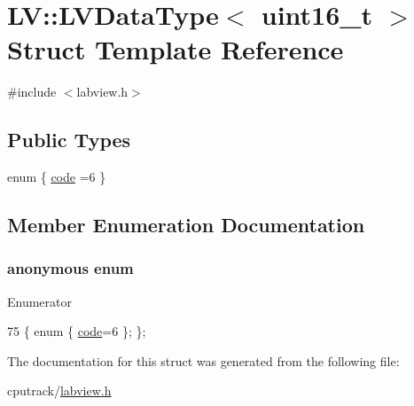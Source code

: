 \hypertarget{struct_l_v_1_1_l_v_data_type_3_01uint16__t_01_4}{}\section{LV\+:\+:L\+V\+Data\+Type$<$ uint16\+\_\+t $>$ Struct Template Reference}
\label{struct_l_v_1_1_l_v_data_type_3_01uint16__t_01_4}


{\ttfamily \#include $<$labview.\+h$>$}

\subsection*{Public Types}
\begin{DoxyCompactItemize}
\item 
enum \{ \hyperlink{struct_l_v_1_1_l_v_data_type_3_01uint16__t_01_4_a0e8b2636b588c5ded7ad49915c7285dca7f0a9b5474d3beb13ab137baa8247eaa}{code} =6
 \}
\end{DoxyCompactItemize}


\subsection{Member Enumeration Documentation}
\subsubsection[{\texorpdfstring{anonymous enum}{anonymous enum}}]{\setlength{\rightskip}{0pt plus 5cm}anonymous enum}\hypertarget{struct_l_v_1_1_l_v_data_type_3_01uint16__t_01_4_a0e8b2636b588c5ded7ad49915c7285dc}{}\label{struct_l_v_1_1_l_v_data_type_3_01uint16__t_01_4_a0e8b2636b588c5ded7ad49915c7285dc}
\begin{Desc}
\item[Enumerator]\par
\begin{description}
\item[{\em 
code\hypertarget{struct_l_v_1_1_l_v_data_type_3_01uint16__t_01_4_a0e8b2636b588c5ded7ad49915c7285dca7f0a9b5474d3beb13ab137baa8247eaa}{}\label{struct_l_v_1_1_l_v_data_type_3_01uint16__t_01_4_a0e8b2636b588c5ded7ad49915c7285dca7f0a9b5474d3beb13ab137baa8247eaa}
}]\end{description}
\end{Desc}

\begin{DoxyCode}
75 \{ \textcolor{keyword}{enum} \{ \hyperlink{struct_l_v_1_1_l_v_data_type_3_01uint16__t_01_4_a0e8b2636b588c5ded7ad49915c7285dca7f0a9b5474d3beb13ab137baa8247eaa}{code}=6 \}; \};
\end{DoxyCode}


The documentation for this struct was generated from the following file\+:\begin{DoxyCompactItemize}
\item 
cputrack/\hyperlink{labview_8h}{labview.\+h}\end{DoxyCompactItemize}
